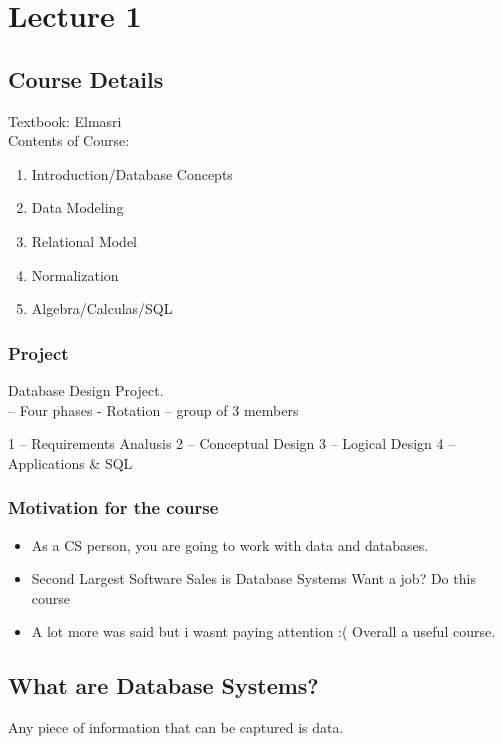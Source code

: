 \chapter{Lecture 1}

\section{Course Details}

Textbook: Elmasri\\

Contents of Course:
\begin{enumerate}
\item Introduction/Database Concepts
\item Data Modeling
\item Relational Model
\item Normalization
\item Algebra/Calculas/SQL
\end{enumerate}

\subsection{Project}

Database Design Project.\\

-- Four phases - Rotation
-- group of 3 members

1 -- Requirements Analusis
2 -- Conceptual Design
3 -- Logical Design 
4 -- Applications \& SQL

\subsection{Motivation for the course}

\begin{itemize}
\item As a CS person, you are going to work with data and databases.
\item Second Largest Software Sales is Database Systems
Want a job? Do this course
\item A lot more was said but i wasnt paying attention :( 
    Overall a useful course.
\end{itemize}

\section{What are Database Systems?}

Any piece of information that can be captured is data. \\

